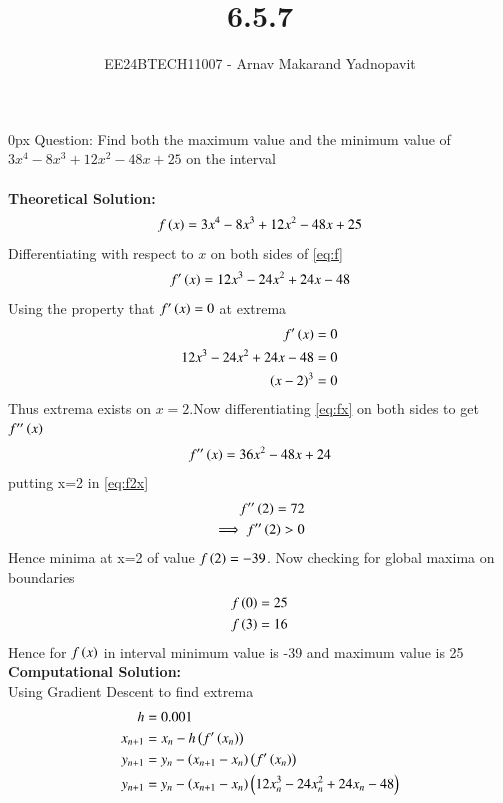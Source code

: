 \documentclass[journal,12pt,onecolumn]{IEEEtran}
\theoremstyle{remark}
\begin{document}
\title{6.5.7}
\author{EE24BTECH11007 - Arnav Makarand Yadnopavit}
\maketitle
\renewcommand{\thefigure}{\theenumi}
\renewcommand{\thetable}{\theenumi}
\parindent 0px Question: Find both the maximum value and the minimum value of $3x^4 - 8x^3 + 12x^2 - 48x + 25$ on the interval \\
\solution\\
\textbf{Theoretical Solution:}\\
\begin{align}
    f\left(x\right)=3x^4 - 8x^3 + 12x^2 - 48x + 25 \label{eq:f}
\end{align}
Differentiating with respect to $x$ on both sides of \eqref{eq:f}
\begin{align}
    f^\prime\left(x\right)=12x^3-24x^2+24x-48 \label{eq:fx}
\end{align}
Using the property that $f^\prime\left(x\right)=0$ at extrema
\begin{align}
    f^\prime\left(x\right)=0\\
    12x^3-24x^2+24x-48=0\\
    \left(x-2\right)^3=0
\end{align}
Thus extrema exists on $x=2$.Now differentiating \eqref{eq:fx} on both sides to get $f^{\prime\prime}\left(x\right)$
\begin{align}
    f^{\prime\prime}\left(x\right)=36x^2-48x+24 \label{eq:f2x}
\end{align}
putting x=2 in \eqref{eq:f2x}
\begin{align}
    f^{\prime\prime}\left(2\right)=72\\
    \implies f^{\prime\prime}\left(2\right)>0
\end{align}
Hence minima at x=2 of value $f\left(2\right)=-39$. Now checking for global maxima on boundaries
\begin{align}
    f\left(0\right)=25\\
    f\left(3\right)=16
\end{align}
Hence for $f\left(x\right)$ in interval  minimum value is -39 and maximum value is 25\\ 
\textbf{Computational Solution:}\\
Using Gradient Descent to find extrema
\begin{align}
    h&=0.001\\
    x_{n+1}&=x_{n}-h\left(f^\prime\left(x_n\right)\right)\\
    y_{n+1}&=y_n-\left(x_{n+1}-x_{n}\right)\left(f^\prime\left(x_n\right)\right)\\
    y_{n+1}&=y_n-\left(x_{n+1}-x_{n}\right)\left(12x_n^3-24x_n^2+24x_n-48\right)\\
\end{align}
\end{document}
